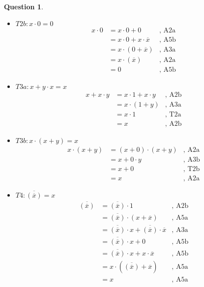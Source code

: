 \documentclass[11pt,a4paper]{article}
\theoremstyle{definition}%
\newtheorem{Q}{Question}[] %
\newcommand{\reponse}[1]{%
	\ifthenelse {\boolean{corrige}} {\paragraph{Réponse :} \color{darkblue}   #1\color{black}} {}
 }
\begin{document}
\begin{Q}
{\begin{itemize}
	\item $T2b : x \cdot 0=0$
	\begin{align*}
		x \cdot 0 & = x \cdot 0 + 0 &\mbox{, A2a} \\
		& = x \cdot 0 + x \cdot \overline{x}&\mbox{, A5b} \\
		& = x \cdot (0 + \overline{x}) &\mbox{, A3a} \\
		& = x \cdot (\overline{x}) &\mbox{, A2a} \\
		& = 0 &\mbox{, A5b}
	\end{align*}

	\item $T3a : x+y \cdot x=x$
	\begin{align*}
		x + x \cdot y & = x \cdot 1 + x \cdot y &\mbox{, A2b}\\
		& = x \cdot (1 + y)&\mbox{, A3a}\\
		& = x \cdot 1&\mbox{, T2a} \\
		& = x &\mbox{, A2b}
	\end{align*}

	\item $T3b : x \cdot (x+y)=x$
	\begin{align*}
		x \cdot (x+y) & = (x+0) \cdot (x+y) &\mbox{, A2a}\\
		& = x + 0 \cdot y &\mbox{, A3b}\\
		& = x + 0 &\mbox{, T2b} \\
		& = x &\mbox{, A2a}
	\end{align*}

	\item $T4 : \overline{(\overline{x})}=x$
	\begin{align*}
		\overline{(\overline{x})} & = \overline{(\overline{x})} \cdot 1 &\mbox{, A2b}\\
		& = \overline{(\overline{x})} \cdot (x + \overline{x}) &\mbox{, A5a}\\
		& = \overline{(\overline{x})} \cdot x + \overline{(\overline{x})} \cdot \overline{x} &\mbox{, A3a}\\
		& = \overline{(\overline{x})} \cdot x + 0 &\mbox{, A5b}\\
		& = \overline{(\overline{x})} \cdot x + x \cdot \overline{x} &\mbox{, A5b}\\
		& = x\cdot (\overline{(\overline{x})} + \overline{x})&\mbox{, A5a}\\
		& = x&\mbox{, A5a}\\
	\end{align*}
\end{itemize}
}

\end{Q}
%


\end{document}
